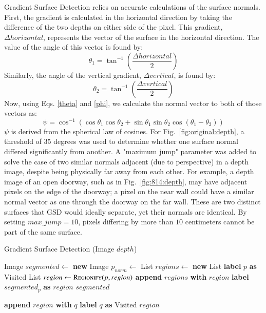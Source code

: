 Gradient Surface Detection relies on accurate calculations of the surface normals. First, the gradient is calculated in the horizontal direction by taking the difference of the two depths on either side of the pixel. This gradient, $\Delta horizontal$, represents the vector of the surface in the horizontal direction. The value of the angle of this vector is found by: 
\begin{equation}\label{theta}\theta_1 = \tan^{-1}{(\frac{\Delta horizontal}{2})} \end{equation}
Similarly, the angle of the vertical gradient, $\Delta vertical$, is found by:
\begin{equation}\label{phi}\theta_2 = \tan^{-1}{(\frac{\Delta vertical}{2})} \end{equation}
Now, using Eqs. \eqref{theta} and \eqref{phi}, we calculate the normal vector to both of those vectors as:
\begin{equation}\label{psi}\psi = \cos^{-1}{(\cos{\theta_1}\cos{\theta_2} + \sin{\theta_1}\sin{\theta_2}\cos{(\theta_1-\theta_2)})} \end{equation}
$\psi$ is derived from the spherical law of cosines. For Fig.~\ref{fig:original:depth}, a threshold of 35 degrees was used to determine whether one surface normal differed significantly from another. A "maximum jump" parameter was added to solve the case of two similar normals adjacent (due to perspective) in a depth image, despite being physically far away from each other. For example, a depth image of an open doorway, such as in Fig.~\ref{fig:814:depth}, may have adjacent pixels on the edge of the doorway; a pixel on the near wall could have a similar normal vector as one through the doorway on the far wall. These are two distinct surfaces that GSD would ideally separate, yet their normals are identical. By setting $max\_jump =  10$, pixels differing by more than $10$ centimeters cannot be part of the same surface.

\begin{algorithm}
\caption{Gradient Surface Detection (Image $depth$)}\label{gradient}
\begin{algorithmic}[1]
\State Image $segmented \gets$ \textbf{new} Image
\State $p_{norm} \gets$  
\EndFor
\State List $regions \gets$ \textbf{new} List
\State \textbf{label} $p$ \textbf{as} Visited
\State List $region \gets \Call{Regionify}{p, region}$
\EndIf
\State \textbf{append} $regions$ \textbf{with} $region$
\EndFor
{}
\State \textbf{label} $segmented_p$ \textbf{as} $region$
\EndFor
\EndFor
\State \Return $segmented$
\item[]
\State \textbf{append} $region$ \textbf{with} $q$
\State \textbf{label} $q$ \textbf{as} Visited
\State {}
\EndIf
\EndFor
\State \Return $region$
\EndProcedure
\end{algorithmic}
\end{algorithm}
